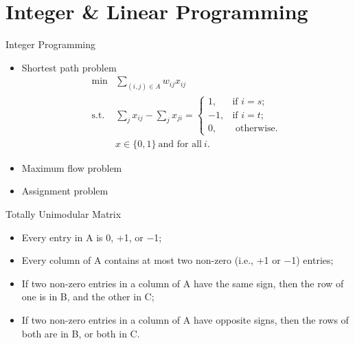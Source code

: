 \section{Integer \& Linear Programming}

    \frame{\sectionpage}

    \begin{frame}{Integer Programming}
        \begin{itemize}
          \item<+-> Shortest path problem
          \begin{equation*}
            \begin{align}
            \min& \sum_{(i,j)\in A}w_{ij}x_{ij}\\
            \text{s.t.} &\sum_{j}x_{ij}-\sum_{j}x_{ji}={\begin{cases}1,&{\text{if }}i=s;\\-1,&{\text{if }}i=t;\\0,&{\text{ otherwise.}}\end{cases}}\\
            & x\in \{0,1\} ~\text{and for all} ~i.
            \end{align}
          \end{equation*}
          \item<+-> Maximum flow problem
          \item<+-> Assignment problem
        \end{itemize}
    \end{frame}

    \begin{frame}{Totally Unimodular Matrix}
      \begin{spacing}{1.5}
        \begin{itemize}
          \item Every entry in A is 0, +1, or −1;
          \item Every column of A contains at most two non-zero (i.e., +1 or −1) entries;
          \item If two non-zero entries in a column of A have the same sign, then the row of one is in B, and the other in C;
          \item If two non-zero entries in a column of A have opposite signs, then the rows of both are in B, or both in C.
        \end{itemize}
      \end{spacing}
    \end{frame}

